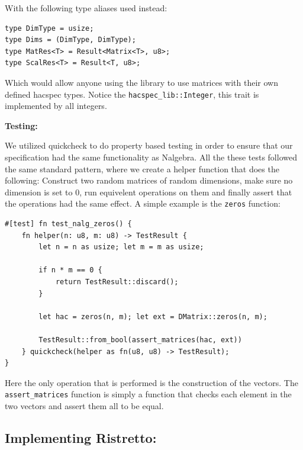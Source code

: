 \documentclass{article}
\begin{document}
With the following type aliases used instead:

\begin{lstlisting}
type DimType = usize;
type Dims = (DimType, DimType);
type MatRes<T> = Result<Matrix<T>, u8>;
type ScalRes<T> = Result<T, u8>;
\end{lstlisting}

Which would allow anyone using the library to use matrices with their
own defined hacspec types. Notice the \texttt{hacspec\_lib::Integer},
this trait is implemented by all integers.

\textbf{Testing:}

We utilized quickcheck to do property based testing in order to ensure
that our specification had the same functionality as Nalgebra. All
the these tests followed the same standard pattern, where we create a
helper function that does the following: Construct two random matrices
of random dimensions, make sure no dimension is set to 0, run equivelent
operations on them and finally assert that the operations had the same
effect. A simple example is the \texttt{zeros} function:

\begin{lstlisting}
#[test] fn test_nalg_zeros() {
    fn helper(n: u8, m: u8) -> TestResult {
        let n = n as usize; let m = m as usize;

        if n * m == 0 {
            return TestResult::discard();
        }

        let hac = zeros(n, m); let ext = DMatrix::zeros(n, m);

        TestResult::from_bool(assert_matrices(hac, ext))
    } quickcheck(helper as fn(u8, u8) -> TestResult);
}
\end{lstlisting}

Here the only operation that is performed is the construction of the
vectors. The \texttt{assert\_matrices} function is simply a function
that checks each element in the two vectors and assert them all to
be equal.

\subsection{Implementing Ristretto:} \label{implementing-ristretto}

\end{document}
